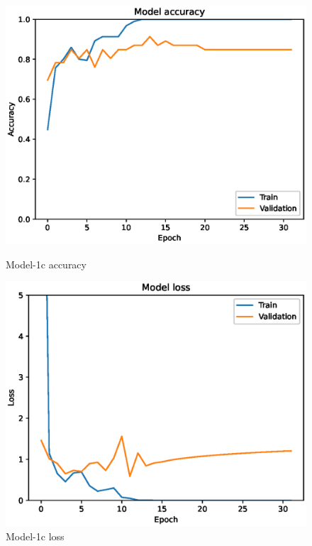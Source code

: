 \begin{figure}
    \centering
    \begin{minipage}{0.45\textwidth}
        \centering
        \includegraphics[width=\textwidth]{./fig/accuracy1c.eps}
        \caption{Model-1c accuracy}
        \label{fig:model1_acc}
    \end{minipage}
    \begin{minipage}{0.45\textwidth}
        \centering
        \includegraphics[width=\textwidth]{./fig/loss1c.eps}
        \caption{Model-1c loss}
        \label{fig:model1_loss}
    \end{minipage}
\end{figure}

